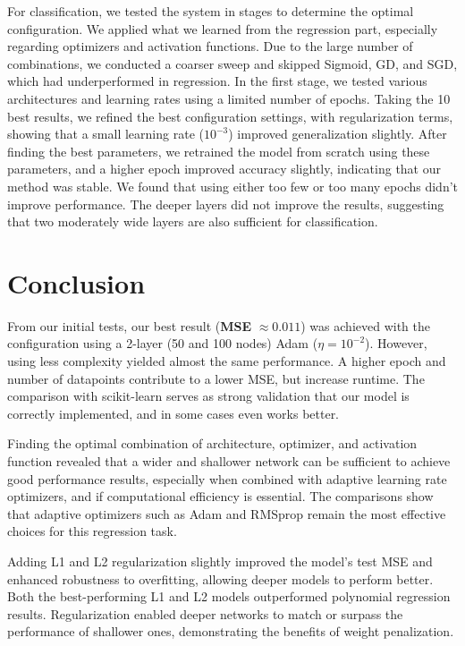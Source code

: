\documentclass[amssymb,twocolumn,aps,floatfix]{revtex4-2}
\begin{document}
For classification, we tested the system in stages to determine the optimal configuration. We applied what we learned from the regression part, especially regarding optimizers and activation functions. Due to the large number of combinations, we conducted a coarser sweep and skipped Sigmoid, GD, and SGD, which had underperformed in regression. In the first stage, we tested various architectures and learning rates using a limited number of epochs. Taking the 10 best results, we refined the best configuration settings, with regularization terms, showing that a small learning rate ($10^{-3}$) improved generalization slightly. After finding the best parameters, we retrained the model from scratch using these parameters, and a higher epoch improved accuracy slightly, indicating that our method was stable. We found that using either too few or too many epochs didn't improve performance. The deeper layers did not improve the results, suggesting that two moderately wide layers are also sufficient for classification. 

\section{Conclusion}\label{section:conclusion} 

From our initial tests, our best result (\textbf{MSE} $\approx 0.011$) was achieved with the configuration using a 2-layer (50 and 100 nodes) Adam ($\eta=10^{-2}$). However, using less complexity yielded almost the same performance. A higher epoch and number of datapoints contribute to a lower MSE, but increase runtime. The comparison with scikit-learn serves as strong validation that our model is correctly implemented, and in some cases even works better. 

Finding the optimal combination of architecture, optimizer, and activation function revealed that a wider and shallower network can be sufficient to achieve good performance results, especially when combined with adaptive learning rate optimizers, and if computational efficiency is essential. The comparisons show that adaptive optimizers such as Adam and RMSprop remain the most effective choices for this regression task.

Adding L1 and L2 regularization slightly improved the model’s test MSE and enhanced robustness to overfitting, allowing deeper models to perform better. Both the best-performing L1 and L2 models outperformed polynomial regression results. Regularization enabled deeper networks to match or surpass the performance of shallower ones, demonstrating the benefits of weight penalization. 
\end{document}
